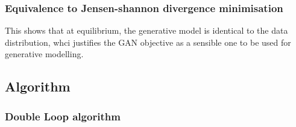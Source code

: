 \documentclass[11pt]{article}
\begin{document}
\subsubsection{Equivalence to Jensen-shannon divergence minimisation}

\begin{figure}[H]
    \centering
\end{figure}

This shows that at equilibrium, the generative model is identical to the data distribution, whci justifies the GAN objective as a sensible one to be used for generative modelling.

\subsection{Algorithm}

\subsubsection{Double Loop algorithm}
\end{document}

